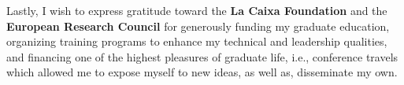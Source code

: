 \begin{Acknowledgements}
	Lastly, I wish to express gratitude toward the \textbf{La Caixa Foundation} and the \textbf{European Research Council} for generously funding my graduate education, organizing training programs to enhance my technical and leadership qualities, and financing one of the highest pleasures of graduate life, i.e., conference travels which allowed me to expose myself to new ideas, as well as, disseminate my own.
	
	
\end{Acknowledgements}
\cleardoublepage